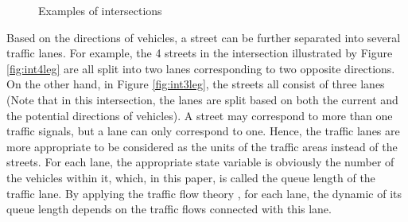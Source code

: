 \documentclass[preprint,authoryear,12pt]{elsarticle}
\begin{document}
\begin{figure}[ht]
  \centering
  \quad
  \caption{Examples of intersections}
\end{figure}

Based on the directions of vehicles, a street can be further separated into several traffic lanes. For example, the 4 streets in the intersection illustrated by Figure \ref{fig:int4leg} are all split into two lanes corresponding to two opposite directions. On the other hand, in Figure \ref{fig:int3leg}, the streets all consist of three lanes (Note that in this intersection, the lanes are split based on both the current and the potential directions of vehicles). A street may correspond to more than one traffic signals, but a lane can only correspond to one. Hence, the traffic lanes are more appropriate to be considered as the units of the traffic areas instead of the streets.
For each lane, the appropriate state variable is obviously the number of the vehicles within it, which, in this paper, is called the queue length of the traffic lane.
By applying the traffic flow theory \citep{nathan_h_gartner_revised_2005}, for each lane, the dynamic of its queue length depends on the traffic flows connected with this lane.
\end{document}

